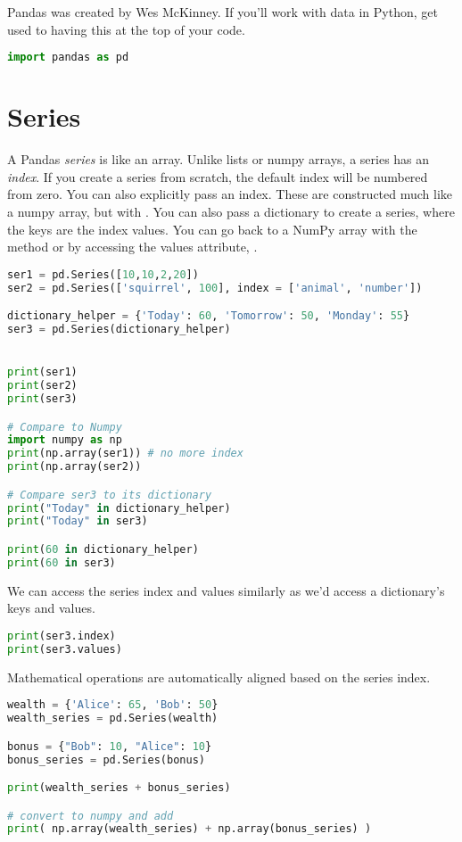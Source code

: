Pandas was created by Wes McKinney. If you'll work with data in Python, get used to having this at the top of your code.
\begin{lstlisting}[language = Python]
import pandas as pd
\end{lstlisting}

\section{Series}

A Pandas \emph{series} is like an array. Unlike lists or numpy arrays, a series has an \emph{index}. If you create a series from scratch, the default index will be numbered from zero. You can also explicitly pass an index. These are constructed much like a numpy array, but with . You can also pass a dictionary to create a series, where the keys are the index values. You can go back to a NumPy array with the method or  by accessing the values attribute, .

\begin{lstlisting}[language = Python]
ser1 = pd.Series([10,10,2,20])
ser2 = pd.Series(['squirrel', 100], index = ['animal', 'number'])

dictionary_helper = {'Today': 60, 'Tomorrow': 50, 'Monday': 55}
ser3 = pd.Series(dictionary_helper)


print(ser1)
print(ser2)
print(ser3)

# Compare to Numpy
import numpy as np
print(np.array(ser1)) # no more index
print(np.array(ser2))

# Compare ser3 to its dictionary
print("Today" in dictionary_helper)
print("Today" in ser3)

print(60 in dictionary_helper)
print(60 in ser3)
\end{lstlisting}

We can access the series index and values similarly as we'd access a dictionary's keys and values. 

\begin{lstlisting}[language = Python]
print(ser3.index)
print(ser3.values)
\end{lstlisting}

\smallskip
\noindent Mathematical operations are automatically aligned based on the series index. 

\begin{lstlisting}[language = Python]
wealth = {'Alice': 65, 'Bob': 50}
wealth_series = pd.Series(wealth)

bonus = {"Bob": 10, "Alice": 10}
bonus_series = pd.Series(bonus)

print(wealth_series + bonus_series)

# convert to numpy and add
print( np.array(wealth_series) + np.array(bonus_series) )
\end{lstlisting}


